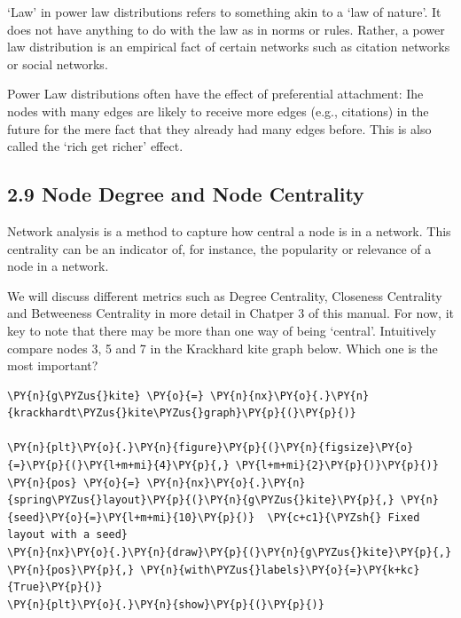     `Law' in power law distributions refers to something akin to a `law of
nature'. It does not have anything to do with the law as in norms or
rules. Rather, a power law distribution is an empirical fact of certain
networks such as citation networks or social networks.

Power Law distributions often have the effect of preferential
attachment: Ihe nodes with many edges are likely to receive more edges
(e.g., citations) in the future for the mere fact that they already had
many edges before. This is also called the `rich get richer' effect.

    \hypertarget{node-degree-and-node-centrality}{%
\subsection{2.9 Node Degree and Node
Centrality}\label{node-degree-and-node-centrality}}

Network analysis is a method to capture how central a node is in a
network. This centrality can be an indicator of, for instance, the
popularity or relevance of a node in a network.

We will discuss different metrics such as Degree Centrality, Closeness
Centrality and Betweeness Centrality in more detail in Chatper 3 of this
manual. For now, it key to note that there may be more than one way of
being `central'. Intuitively compare nodes 3, 5 and 7 in the Krackhard
kite graph below. Which one is the most important?

    \begin{tcolorbox}[breakable, size=fbox, boxrule=1pt, pad at break*=1mm,colback=cellbackground, colframe=cellborder]
\begin{Verbatim}[commandchars=\\\{\}]
\PY{n}{g\PYZus{}kite} \PY{o}{=} \PY{n}{nx}\PY{o}{.}\PY{n}{krackhardt\PYZus{}kite\PYZus{}graph}\PY{p}{(}\PY{p}{)}

\PY{n}{plt}\PY{o}{.}\PY{n}{figure}\PY{p}{(}\PY{n}{figsize}\PY{o}{=}\PY{p}{(}\PY{l+m+mi}{4}\PY{p}{,} \PY{l+m+mi}{2}\PY{p}{)}\PY{p}{)}  
\PY{n}{pos} \PY{o}{=} \PY{n}{nx}\PY{o}{.}\PY{n}{spring\PYZus{}layout}\PY{p}{(}\PY{n}{g\PYZus{}kite}\PY{p}{,} \PY{n}{seed}\PY{o}{=}\PY{l+m+mi}{10}\PY{p}{)}  \PY{c+c1}{\PYZsh{} Fixed layout with a seed}
\PY{n}{nx}\PY{o}{.}\PY{n}{draw}\PY{p}{(}\PY{n}{g\PYZus{}kite}\PY{p}{,} \PY{n}{pos}\PY{p}{,} \PY{n}{with\PYZus{}labels}\PY{o}{=}\PY{k+kc}{True}\PY{p}{)} 
\PY{n}{plt}\PY{o}{.}\PY{n}{show}\PY{p}{(}\PY{p}{)}
\end{Verbatim}
\end{tcolorbox}

